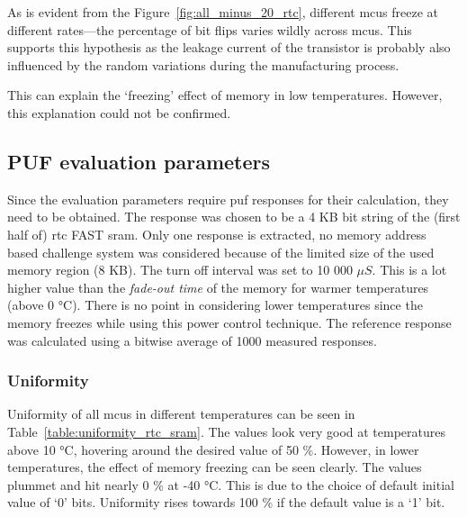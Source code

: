 As is evident from the Figure~\ref{fig:all_minus_20_rtc}, different \glspl{mcu} freeze at different rates---the percentage of bit flips varies wildly across \glspl{mcu}. This supports this hypothesis as the leakage current of the transistor is probably also influenced by the random variations during the manufacturing process.

This can explain the `freezing' effect of memory in low temperatures. However, this explanation could not be confirmed.

\subsection{PUF evaluation parameters}\label{sec:rtc_evaluation}

Since the evaluation parameters require \gls{puf} responses for their calculation, they need to be obtained. The response was chosen to be a 4 KB bit string of the (first half of) \gls{rtc} FAST \gls{sram}. Only one response is extracted, no memory address based challenge system was considered because of the limited size of the used memory region (8 KB). The turn off interval was set to 10 000 $\mu{}S$. This is a lot higher value than the \emph{fade-out time} of the memory for warmer temperatures (above 0 °C). There is no point in considering lower temperatures since the memory freezes while using this power control technique. The reference response was calculated using a bitwise average of 1000 measured responses.

\subsubsection*{Uniformity}

Uniformity of all \glspl{mcu} in different temperatures can be seen in Table~\ref{table:uniformity_rtc_sram}. The values look very good at temperatures above 10 °C, hovering around the desired value of 50 \%. However, in lower temperatures, the effect of memory freezing can be seen clearly. The values plummet and hit nearly 0 \% at -40 °C. This is due to the choice of default initial value of `0' bits. Uniformity rises towards 100 \% if the default value is a `1' bit.

